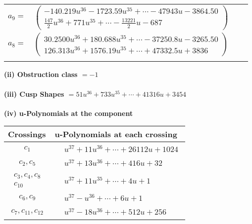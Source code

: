 \documentclass[1p]{elsarticle_modified}
\theoremstyle{definition}
\begin{document}
\begin{tabular}{m{7pt} m{180pt} m{7pt} m{180pt} }
\flushright $a_{9}=$&$\begin{pmatrix}-140.219 u^{36}-1723.59 u^{35}+\cdots-47943 u-3864.50\\\frac{147}{2} u^{36}+771 u^{35}+\cdots-\frac{13221}{2} u-687\end{pmatrix}$ \\
\flushright $a_{8}=$&$\begin{pmatrix}30.2500 u^{36}+180.688 u^{35}+\cdots-37250.8 u-3265.50\\126.313 u^{36}+1576.19 u^{35}+\cdots+47332.5 u+3836\end{pmatrix}$\\&\end{tabular}
\flushleft \textbf{(ii) Obstruction class $= -1$}\\~\\
\flushleft \textbf{(iii) Cusp Shapes $= 51 u^{36}+733 u^{35}+\cdots+41316 u+3454$}\\~\\
\newpage\renewcommand{\arraystretch}{1}
\flushleft \textbf{(iv) u-Polynomials at the component}\newline \\
\begin{tabular}{m{50pt}|m{274pt}}
Crossings & \hspace{64pt}u-Polynomials at each crossing \\
\hline $$\begin{aligned}c_{1}\end{aligned}$$&$\begin{aligned}
&u^{37}+11 u^{36}+\cdots+26112 u+1024
\end{aligned}$\\
\hline $$\begin{aligned}c_{2},c_{5}\end{aligned}$$&$\begin{aligned}
&u^{37}+13 u^{36}+\cdots+416 u+32
\end{aligned}$\\
\hline $$\begin{aligned}c_{3},c_{4},c_{8}\\c_{10}\end{aligned}$$&$\begin{aligned}
&u^{37}+11 u^{35}+\cdots+4 u+1
\end{aligned}$\\
\hline $$\begin{aligned}c_{6},c_{9}\end{aligned}$$&$\begin{aligned}
&u^{37}- u^{36}+\cdots+6 u+1
\end{aligned}$\\
\hline $$\begin{aligned}c_{7},c_{11},c_{12}\end{aligned}$$&$\begin{aligned}
&u^{37}-18 u^{36}+\cdots+512 u+256
\end{aligned}$\\
\hline
\end{tabular}\\~\\
\end{document}
